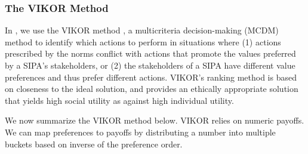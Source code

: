 \subsubsection{The VIKOR Method}


In \frameworkAinur, we use the VIKOR
method \citep{opricovic2004compromise}, a multicriteria decision-making (MCDM) method to identify which
actions to perform in situations where (1) actions prescribed by the norms
conflict with actions that promote the values preferred by a SIPA's
stakeholders, or (2) the stakeholders of a SIPA have different value
preferences and thus prefer different actions.
VIKOR's ranking method is based on closeness to the ideal solution, and provides an ethically appropriate solution that yields high social utility as against high individual utility.

We now summarize the VIKOR method  \citep{opricovic2004compromise} below. 
VIKOR relies on numeric payoffs. 
We can map preferences to payoffs by distributing a number into multiple buckets based on inverse of the preference order.

